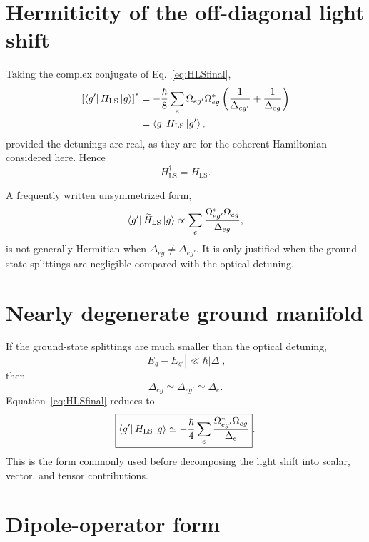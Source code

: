 \documentclass[11pt]{article}
\newcommand{\HLS}{H_{\mathrm{LS}}}
\begin{document}
\section{Hermiticity of the off-diagonal light shift}

Taking the complex conjugate of Eq.~\eqref{eq:HLSfinal},
\begin{align}
\left[\bra{g'}\HLS\ket{g}\right]^*
&=
-\frac{\hbar}{8}
\sum_e
\Omega_{eg'}\Omega_{eg}^*
\left(
\frac{1}{\Delta_{eg'}}
+
\frac{1}{\Delta_{eg}}
\right)
\nonumber\\
&=
\bra{g}\HLS\ket{g'},
\label{eq:Hermitianproof}
\end{align}
provided the detunings are real, as they are for the coherent Hamiltonian considered here. Hence
\begin{equation}
\boxed{
\HLS^\dagger=\HLS
}.
\label{eq:HLShermitian}
\end{equation}

A frequently written unsymmetrized form,
\begin{equation}
\bra{g'}\widetilde H_{\mathrm{LS}}\ket{g}
\propto
\sum_e
\frac{\Omega_{eg'}^*\Omega_{eg}}{\Delta_{eg}},
\label{eq:wrongunsym}
\end{equation}
is not generally Hermitian when $\Delta_{eg}\neq\Delta_{eg'}$. It is only justified when the ground-state splittings are negligible compared with the optical detuning.

\section{Nearly degenerate ground manifold}

If the ground-state splittings are much smaller than the optical detuning,
\begin{equation}
|E_g-E_{g'}|\ll \hbar|\Delta|,
\label{eq:degcond}
\end{equation}
then
\begin{equation}
\Delta_{eg}\simeq\Delta_{eg'}\simeq\Delta_e.
\label{eq:degeq}
\end{equation}
Equation~\eqref{eq:HLSfinal} reduces to
\begin{equation}
\boxed{
\bra{g'}\HLS\ket{g}
\simeq
-\frac{\hbar}{4}
\sum_e
\frac{\Omega_{eg'}^*\Omega_{eg}}{\Delta_e}
}.
\label{eq:HLSdeg}
\end{equation}
This is the form commonly used before decomposing the light shift into scalar, vector, and tensor contributions.

\section{Dipole-operator form}
\end{document}
